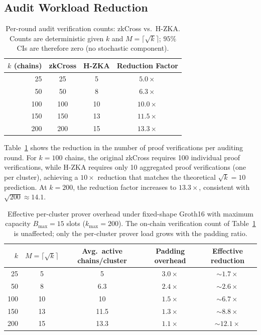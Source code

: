 \documentclass[journal]{IEEEtran}
\begin{document}
\subsection{Audit Workload Reduction}

\begin{table}[t]
\centering
\caption{Per-round audit verification counts: zkCross vs.\ H-ZKA. Counts are deterministic given $k$ and $M=\lceil\sqrt{k}\rceil$; $95\%$ CIs are therefore zero (no stochastic component).}
\label{tab:workload}
\begin{tabular}{rccc}
\toprule
$k$ (chains) & zkCross & H-ZKA & Reduction Factor \\
\midrule
25  & 25  & 5  & $5.0\times$ \\
50  & 50  & 8  & $6.3\times$ \\
100 & 100 & 10 & $10.0\times$ \\
150 & 150 & 13 & $11.5\times$ \\
200 & 200 & 15 & $13.3\times$ \\
\bottomrule
\end{tabular}
\end{table}

Table~\ref{tab:workload} shows the reduction in the number of proof verifications per auditing round. For $k = 100$ chains, the original zkCross requires 100 individual proof verifications, while H-ZKA requires only 10 aggregated proof verifications (one per cluster), achieving a $10\times$ reduction that matches the theoretical $\sqrt{k} = 10$ prediction. At $k = 200$, the reduction factor increases to $13.3\times$, consistent with $\sqrt{200} \approx 14.1$.

\begin{table}[t]
\centering
\caption{Effective per-cluster prover overhead under fixed-shape Groth16 with maximum capacity $B_{\max}=15$ slots ($k_{\max}=200$). The on-chain verification count of Table~\ref{tab:workload} is unaffected; only the per-cluster prover load grows with the padding ratio.}
\label{tab:workload-padded}
\begin{tabular}{rcccc}
\toprule
$k$ & $M=\lceil\sqrt{k}\rceil$ & Avg.\ active chains/cluster & Padding overhead & Effective reduction \\
\midrule
25  & 5  & 5    & $3.0\times$ & $\sim 1.7\times$ \\
50  & 8  & 6.3  & $2.4\times$ & $\sim 2.6\times$ \\
100 & 10 & 10   & $1.5\times$ & $\sim 6.7\times$ \\
150 & 13 & 11.5 & $1.3\times$ & $\sim 8.8\times$ \\
200 & 15 & 13.3 & $1.1\times$ & $\sim 12.1\times$ \\
\bottomrule
\end{tabular}
\end{table}
\end{document}
